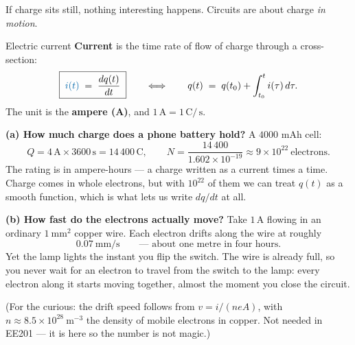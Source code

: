 \documentclass[11pt,a4paper]{article}
\newcommand{\Icol}[1]{\textcolor{ccur}{#1}}
\newcommand{\Qcol}[1]{\textcolor{ccharge}{#1}}
\newcommand{\uni}[1]{\,\mathrm{#1}}
\newcommand{\A}{\uni{A}}   \newcommand{\V}{\uni{V}}
\newcommand{\Cb}{\uni{C}}  \newcommand{\s}{\uni{s}}
\begin{document}
If charge sits still, nothing interesting happens. Circuits are about charge \emph{in
motion}.

\begin{definitionbox}{Electric current}
\textbf{Current} is the time rate of flow of charge through a cross-section:
\[
  \boxed{\;\Icol{i(t)} \;=\; \frac{dq(t)}{dt}\;}
  \qquad\Longleftrightarrow\qquad
  q(t) \;=\; q(t_0) + \int_{t_0}^{t} i(\tau)\,d\tau .
\]
The unit is the \textbf{ampere (A)}, and $1\A = 1\Cb/\s$.
\end{definitionbox}

\begin{center}
\end{center}

\begin{examplebox}
\textbf{(a) How much charge does a phone battery hold?} A $4000$ mAh cell:
\[
  Q = 4\A \times 3600\s = 14\,400\Cb ,
  \qquad
  N = \frac{14\,400}{1.602\times10^{-19}} \approx 9\times10^{22}\ \text{electrons}.
\]
The rating is in ampere-hours --- a charge written as a current times a time. Charge comes
in whole electrons, but with $10^{22}$ of them we can treat \Qcol{$q(t)$} as a smooth
function, which is what lets us write $dq/dt$ at all.

\smallskip
\textbf{(b) How fast do the electrons actually move?} Take $1\A$ flowing in an ordinary
$1\ \mathrm{mm^2}$ copper wire. Each electron drifts along the wire at roughly
\[
  0.07\ \mathrm{mm/s} \qquad\text{--- about one metre in four hours.}
\]
Yet the lamp lights the instant you flip the switch. The wire is already full, so you
never wait for an electron to travel from the switch to the lamp: every electron along it
starts moving together, almost the moment you close the circuit.

\smallskip
{\footnotesize (For the curious: the drift speed follows from $v = i/(n e A)$, with
$n \approx 8.5\times10^{28}\ \mathrm{m^{-3}}$ the density of mobile electrons in copper.
Not needed in EE201 --- it is here so the number is not magic.)}
\end{examplebox}
\end{document}
